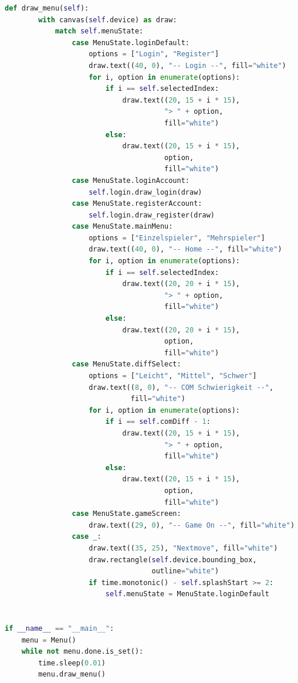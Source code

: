 \begin{scriptsize}
\begin{lstlisting}[style=Python, language=Python, captionpos=b, stepnumber=5, caption = {oopmenu.py}, label={lst:oopmenu}]
    def draw_menu(self):
        with canvas(self.device) as draw:
            match self.menuState:
                case MenuState.loginDefault:
                    options = ["Login", "Register"]
                    draw.text((40, 0), "-- Login --", fill="white")
                    for i, option in enumerate(options):
                        if i == self.selectedIndex:
                            draw.text((20, 15 + i * 15),
                                      "> " + option,
                                      fill="white")
                        else:
                            draw.text((20, 15 + i * 15),
                                      option,
                                      fill="white")
                case MenuState.loginAccount:
                    self.login.draw_login(draw)
                case MenuState.registerAccount:
                    self.login.draw_register(draw)
                case MenuState.mainMenu:
                    options = ["Einzelspieler", "Mehrspieler"]
                    draw.text((40, 0), "-- Home --", fill="white")
                    for i, option in enumerate(options):
                        if i == self.selectedIndex:
                            draw.text((20, 20 + i * 15),
                                      "> " + option,
                                      fill="white")
                        else:
                            draw.text((20, 20 + i * 15),
                                      option,
                                      fill="white")
                case MenuState.diffSelect:
                    options = ["Leicht", "Mittel", "Schwer"]
                    draw.text((8, 0), "-- COM Schwierigkeit --",
                              fill="white")
                    for i, option in enumerate(options):
                        if i == self.comDiff - 1:
                            draw.text((20, 15 + i * 15),
                                      "> " + option,
                                      fill="white")
                        else:
                            draw.text((20, 15 + i * 15),
                                      option,
                                      fill="white")
                case MenuState.gameScreen:
                    draw.text((29, 0), "-- Game On --", fill="white")
                case _:
                    draw.text((35, 25), "Nextmove", fill="white")
                    draw.rectangle(self.device.bounding_box,
                                   outline="white")
                    if time.monotonic() - self.splashStart >= 2:
                        self.menuState = MenuState.loginDefault


if __name__ == "__main__":
    menu = Menu()
    while not menu.done.is_set():
        time.sleep(0.01)
        menu.draw_menu()

\end{lstlisting}
\end{scriptsize}

